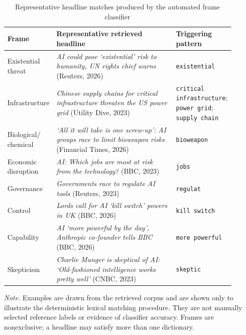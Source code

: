 \elsevierclasstrue\documentclass[preprint,12pt]{elsarticle}%
\begin{document}
\begin{table}[ht!]
\centering
\small
\caption{Representative headline matches produced by the automated frame classifier}
\label{tab:frameexamples}

\begin{tabular}{
>{\raggedright\arraybackslash}p{0.16\linewidth}
>{\raggedright\arraybackslash}p{0.55\linewidth}
>{\raggedright\arraybackslash}p{0.20\linewidth}}
\toprule
Frame & Representative retrieved headline & Triggering pattern \\
\midrule

Existential threat &
\emph{AI could pose `existential' risk to humanity, UN rights chief warns}
(Reuters, 2026) &
\texttt{existential} \\

Infrastructure &
\emph{Chinese supply chains for critical infrastructure threaten the US power grid}
(Utility Dive, 2023) &
\texttt{critical infrastructure};
\texttt{power grid};
\texttt{supply chain} \\

Biological/ chemical &
\emph{`All it will take is one screw-up': AI groups race to limit bioweapon risks}
(Financial Times, 2026) &
\texttt{bioweapon} \\

Economic disruption &
\emph{AI: Which jobs are most at risk from the technology?}
(BBC, 2023) &
\texttt{jobs} \\

Governance &
\emph{Governments race to regulate AI tools}
(Reuters, 2023) &
\texttt{regulat} \\

Control &
\emph{Lords call for AI `kill switch' powers in UK}
(BBC, 2026) &
\texttt{kill switch} \\

Capability &
\emph{AI `more powerful by the day', Anthropic co-founder tells BBC}
(BBC, 2026) &
\texttt{more powerful} \\

Skepticism &
\emph{Charlie Munger is skeptical of AI: `Old-fashioned intelligence works pretty well'}
(CNBC, 2023) &
\texttt{skeptic} \\

\bottomrule
\end{tabular}

\begin{minipage}{0.94\linewidth}
\footnotesize
\textit{Note.} Examples are drawn from the retrieved corpus and are shown only
to illustrate the deterministic lexical matching procedure. They are not
manually selected reference labels or evidence of classifier accuracy. Frames
are nonexclusive; a headline may satisfy more than one dictionary.
\end{minipage}
\end{table}
\end{document}
